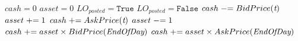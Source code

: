 \begin{algorithmic}[1]
\State $cash = 0$
\State $asset = 0$
		\State $LO_{posted} = \texttt{True}$
	\Else
		\State $LO_{posted} = \texttt{False}$
	\EndIf
				\State $cash \mathrel{-}= BidPrice(\textit{t})$	
				\State $asset \mathrel{+}= 1$
				\State $cash \mathrel{+}= AskPrice(\textit{t})$
				\State $asset \mathrel{-}= 1$
			\EndIf
		\EndFor
	\EndIf
\EndFor
{} 
\State $cash \mathrel{+}= asset \times BidPrice(\textit{EndOfDay})$
\State $cash \mathrel{+}= asset \times AskPrice(\textit{EndOfDay})$	
\EndIf
\end{algorithmic}
